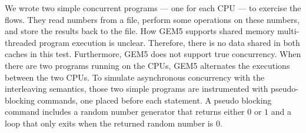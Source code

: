 \documentclass[conference]{IEEEtran}
\begin{document}


We wrote two simple concurrent programs --- one for each CPU
--- to exercise the flows.  They read numbers from a file,
perform some operations on these numbers, and store the
results back to the file.  How GEM5 supports shared memory
multi-threaded program execution is unclear.  Therefore,
there is no data shared in both caches in this test.
Furthermore, GEM5 does not support true concurrency.  When
there are two programs running on the CPUs, GEM5 alternates
the executions between the two CPUs.  To simulate
asynchronous concurrency with the interleaving semantics,
those two simple programs are instrumented with
pseudo-blocking commands, one placed before each statement.
A pseudo blocking command includes a random number generator
that returns either $0$ or $1$ and a loop that only exits
when the returned random number is $0$.

\end{document}
